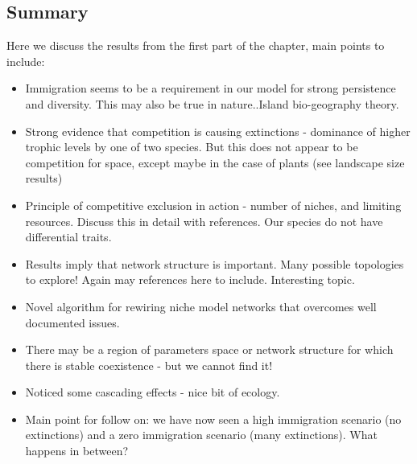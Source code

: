 \subsection{Summary}
\label{sec:disucss_persitence}

Here we discuss the results from the first part of the chapter, main points to include:
\begin{itemize}
	\item Immigration seems to be a requirement in our model for strong persistence and diversity. This may also be true in nature..Island bio-geography theory.
	\item Strong evidence that competition is causing extinctions - dominance of higher trophic levels by one of two species. But this does not appear to be competition for space, except maybe in the case of plants (see landscape size results)
	\item Principle of competitive exclusion in action - number of niches, and limiting resources. Discuss this in detail with references. Our species do not have differential traits.
	\item Results imply that network structure is important. Many possible topologies to explore! Again may references here to include. Interesting topic.
	\item Novel algorithm for rewiring niche model networks that overcomes well documented issues.
	\item There may be a region of parameters space or network structure for which there is stable coexistence - but we cannot find it!
	\item Noticed some cascading effects - nice bit of ecology.
	\item Main point for follow on: we have now seen a high immigration scenario (no extinctions) and a zero immigration scenario (many extinctions). What happens in between?
\end{itemize}

